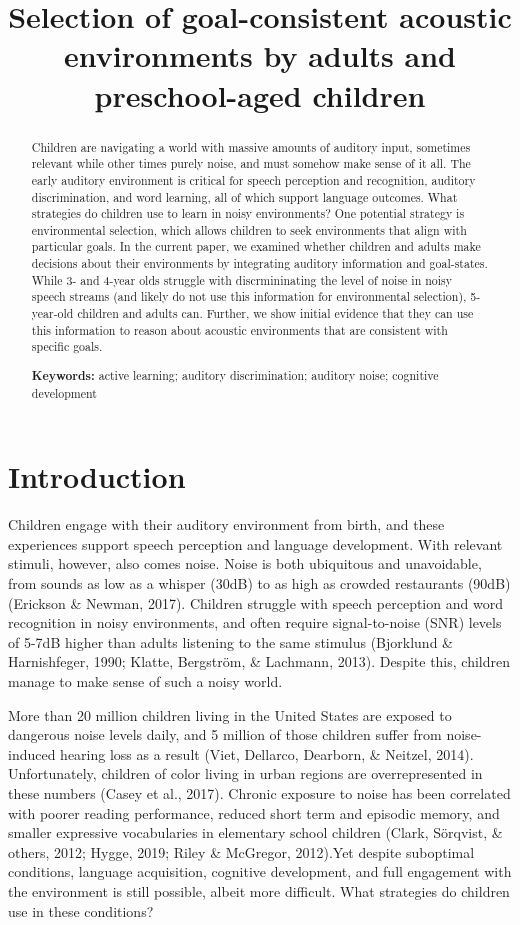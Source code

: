 \documentclass[10pt, letterpaper]{article}
\title{Selection of goal-consistent acoustic environments by adults and
preschool-aged children}
\begin{document}
\maketitle

\begin{abstract}
Children are navigating a world with massive amounts of auditory input,
sometimes relevant while other times purely noise, and must somehow make
sense of it all. The early auditory environment is critical for speech
perception and recognition, auditory discrimination, and word learning,
all of which support language outcomes. What strategies do children use
to learn in noisy environments? One potential strategy is environmental
selection, which allows children to seek environments that align with
particular goals. In the current paper, we examined whether children and
adults make decisions about their environments by integrating auditory
information and goal-states. While 3- and 4-year olds struggle with
discrmininating the level of noise in noisy speech streams (and likely
do not use this information for environmental selection), 5-year-old
children and adults can. Further, we show initial evidence that they can
use this information to reason about acoustic environments that are
consistent with specific goals.

\textbf{Keywords:}
active learning; auditory discrimination; auditory noise; cognitive
development
\end{abstract}

\hypertarget{introduction}{%
\section{Introduction}\label{introduction}}

Children engage with their auditory environment from birth, and these
experiences support speech perception and language development. With
relevant stimuli, however, also comes noise. Noise is both ubiquitous
and unavoidable, from sounds as low as a whisper (30dB) to as high as
crowded restaurants (90dB) (Erickson \& Newman, 2017). Children struggle
with speech perception and word recognition in noisy environments, and
often require signal-to-noise (SNR) levels of 5-7dB higher than adults
listening to the same stimulus (Bjorklund \& Harnishfeger, 1990; Klatte,
Bergström, \& Lachmann, 2013). Despite this, children manage to make
sense of such a noisy world.

More than 20 million children living in the United States are exposed to
dangerous noise levels daily, and 5 million of those children suffer
from noise-induced hearing loss as a result (Viet, Dellarco, Dearborn,
\& Neitzel, 2014). Unfortunately, children of color living in urban
regions are overrepresented in these numbers (Casey et al., 2017).
Chronic exposure to noise has been correlated with poorer reading
performance, reduced short term and episodic memory, and smaller
expressive vocabularies in elementary school children (Clark, Sörqvist,
\& others, 2012; Hygge, 2019; Riley \& McGregor, 2012).Yet despite
suboptimal conditions, language acquisition, cognitive development, and
full engagement with the environment is still possible, albeit more
difficult. What strategies do children use in these conditions?
\end{document}
